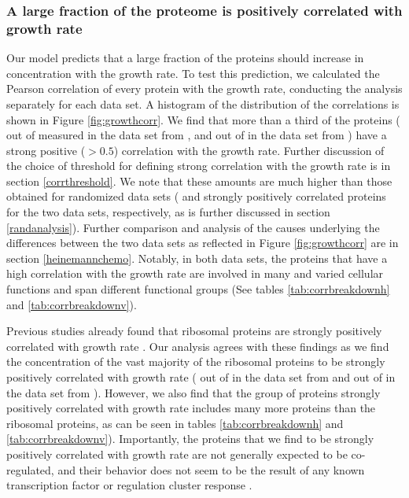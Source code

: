 \subsubsection{A large fraction of the proteome is positively correlated with growth rate}
Our model predicts that a large fraction of the proteins should increase in concentration with the growth rate.
To test this prediction, we calculated the Pearson correlation of every protein with the growth rate, conducting the analysis separately for each data set.
A histogram of the distribution of the correlations is shown in Figure \ref{fig:growthcorr}.
We find that more than a third of the proteins (\hGlobal{} out of \hTotal{} measured in the data set from \cite{Heinemann2015}, and \vGlobal{} out of \vTotal{} in the data set from \cite{Valgepea2013}) have a strong positive ($>0.5$) correlation with the growth rate.
Further discussion of the choice of threshold for defining strong correlation with the growth rate is in section \ref{corrthreshold}.
We note that these amounts are much higher than those obtained for randomized data sets (\hGlobalShuff{} and \vGlobalShuff{} strongly positively correlated proteins for the two data sets, respectively, as is further discussed in section \ref{randanalysis}).
Further comparison and analysis of the causes underlying the differences between the two data sets as reflected in Figure \ref{fig:growthcorr} are in section \ref{heinemannchemo}.
Notably, in both data sets, the proteins that have a high correlation with the growth rate are involved in many and varied cellular functions and span different functional groups (See tables \ref{tab:corrbreakdownh} and \ref{tab:corrbreakdownv}).

Previous studies already found that ribosomal proteins are strongly positively correlated with growth rate \cite{Pedersen1978a, ingraham1983growth, Klumpp2008}.
Our analysis agrees with these findings as we find the concentration of the vast majority of the ribosomal proteins to be strongly positively correlated with growth rate (\hCorrRibs{} out of \hRibs{} in the data set from \cite{Heinemann2015} and \vCorrRibs{} out of \vRibs{} in the data set from \cite{Valgepea2013}).
However, we also find that the group of proteins strongly positively correlated with growth rate includes many more proteins than the ribosomal proteins, as can be seen in tables \ref{tab:corrbreakdownh} and \ref{tab:corrbreakdownv}).
Importantly, the proteins that we find to be strongly positively correlated with growth rate are not generally expected to be co-regulated, and their behavior does not seem to be the result of any known transcription factor or regulation cluster response \cite{23203884}.